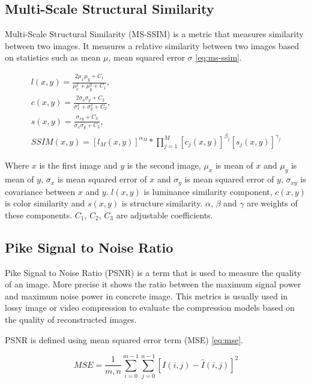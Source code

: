 \subsection{Multi-Scale Structural Similarity}

Multi-Scale Structural Similarity (MS-SSIM) is a metric that measures similarity between two images. It measures a relative similarity between two images based on statistics such as mean $\mu$, mean squared error $\sigma$ \ref{eq:ms-ssim}.

\begin{equation}
    \label{eq:ms-ssim}
    \begin{split}
        l(x, y) = \frac{2\mu_x\mu_y + C_1}{\mu_x^2 + \mu_y^2 + C_1},\\
        c(x, y) = \frac{2\sigma_x\sigma_y + C_2}{\sigma_x^2 + \sigma_y^2 + C_2},\\
        s(x, y) = \frac{\sigma_{xy} + C_3}{\sigma_x\sigma_y + C_3},\\
        SSIM(x, y) = [l_M(x, y)]^{\alpha_M} * \prod_{j=1}^{M}[c_j(x, y)]^{\beta_j}[s_j(x, y)]^{\gamma_j}
    \end{split}
\end{equation}

Where $x$ is the first image and $y$ is the second image, $\mu_x$ is mean of $x$ and $\mu_y$ is mean of $y$, $\sigma_x$ is mean squared error of $x$ and $\sigma_y$ is mean squared error of $y$, $\sigma_{xy}$ is covariance between $x$ and $y$. $l(x, y)$ is luminance similarity component, $c(x, y)$ is color similarity and $s(x, y)$ is structure similarity. $\alpha$, $\beta$ and $\gamma$ are weights of these components. $C_1$, $C_2$, $C_3$ are adjustable coefficients.

\subsection{Pike Signal to Noise Ratio}

Pike Signal to Noise Ratio (PSNR) is a term that is used to measure the quality of an image. More precise it shows the ratio between the maximum signal power and maximum noise power in concrete image. This metrics is usually used in lossy image or video compression to evaluate the compression models based on the quality of reconstructed images.

PSNR is defined using mean squared error term (MSE) \ref{eq:mse}.

\begin{equation}
    \label{eq:mse}
    \mathit{MSE} = \frac{1}{m,n} \sum _{i=0}^{m-1} \sum _{j=0}^{n-1} [I(i,j)-\hat{I}(i,j)]^{2}
\end{equation}

